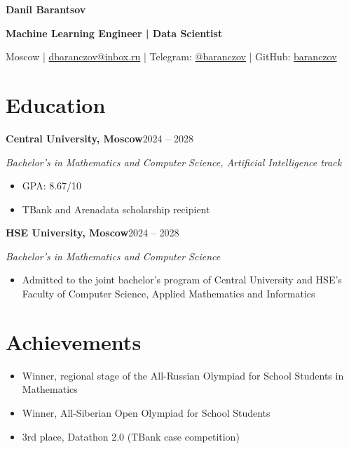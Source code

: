 \documentclass[a4paper,11pt]{article}
\newcommand{\entry}[3]{\textbf{#1}\hfill #3\par\textit{#2}\par}
\begin{document}
\fontsize{10.5}{13}\selectfont
\begin{center}
{\fontsize{14.3}{17}\selectfont\bfseries Danil Barantsov}\par
{\bfseries Machine Learning Engineer | Data Scientist}\par
Moscow | \href{mailto:dbaranczov@inbox.ru}{dbaranczov@inbox.ru} |
Telegram: \href{https://t.me/baranczov}{@baranczov} |
GitHub: \href{https://github.com/baranczov}{baranczov}
\end{center}
\vspace{-2pt}
\section*{Education}
\entry{Central University, Moscow}{Bachelor's in Mathematics and Computer Science, Artificial Intelligence track}{2024 -- 2028}
\begin{itemize}
\item GPA: 8.67/10
\item TBank and Arenadata scholarship recipient
\end{itemize}
\vspace{3pt}
\entry{HSE University, Moscow}{Bachelor's in Mathematics and Computer Science}{2024 -- 2028}
\begin{itemize}
\item Admitted to the joint bachelor's program of Central University and HSE's Faculty of Computer Science, Applied Mathematics and Informatics
\end{itemize}
\section*{Achievements}
\begin{itemize}
\item Winner, regional stage of the All-Russian Olympiad for School Students in Mathematics
\item Winner, All-Siberian Open Olympiad for School Students
\item 3rd place, Datathon 2.0 (TBank case competition)
\end{itemize}
\end{document}
